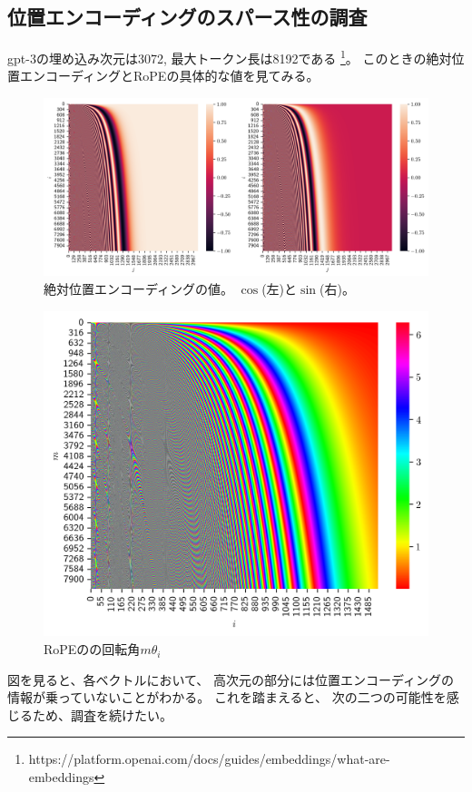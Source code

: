 \documentclass{jsarticle}
\begin{document}
    \subsection{位置エンコーディングのスパース性の調査}
        gpt-3の埋め込み次元は3072, 最大トークン長は8192である
        \footnote{https://platform.openai.com/docs/guides/embeddings/what-are-embeddings}。
        このときの絶対位置エンコーディングとRoPEの具体的な値を見てみる。
        \begin{figure}[h]
            \centering
            \includegraphics[width=1\linewidth]{absolute.png}
            \caption{
                絶対位置エンコーディングの値。
                $\cos$(左)と$\sin$(右)。
            }
        \end{figure}
        \begin{figure}[h]
            \centering
            \includegraphics[width=0.8\linewidth]{rope.png}
            \caption{
                RoPEのの回転角$m\theta_i$
            }
        \end{figure}
        図を見ると、各ベクトルにおいて、
        高次元の部分には位置エンコーディングの情報が乗っていないことがわかる。
        これを踏まえると、
        次の二つの可能性を感じるため、調査を続けたい。
\end{document}
